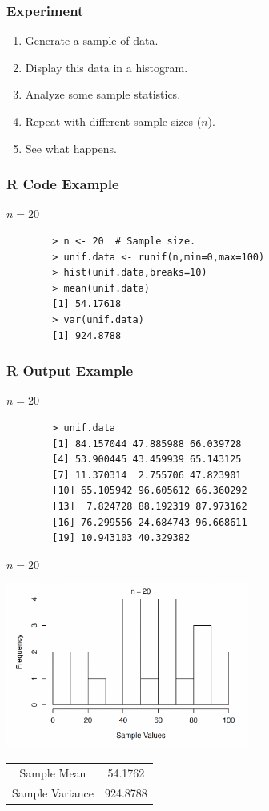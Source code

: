\documentclass[12pt]{beamer}
\begin{document}
\begin{frame}
	\frametitle{Experiment}
	
	\begin{enumerate}[label=\textcolor{blue}{\arabic*.}]
		\item Generate a sample of data.
		\item Display this data in a histogram.
		\item Analyze some sample statistics.
		\item Repeat with different sample sizes ($n$).
		\item See what happens.
	\end{enumerate}
	
\end{frame}
\begin{frame}[fragile]
	\frametitle{R Code Example}
	
	\begin{center}
		\Large $n = 20$
	\end{center}

	\begin{verbatim}
		> n <- 20  # Sample size.
		> unif.data <- runif(n,min=0,max=100)
		> hist(unif.data,breaks=10)
		> mean(unif.data)
		[1] 54.17618
		> var(unif.data)
		[1] 924.8788
	\end{verbatim}
	
\end{frame}
\begin{frame}[fragile]
	\frametitle{R Output Example}
	
	\begin{center}
		\Large $n = 20$
	\end{center}
	
	\begin{verbatim}
		> unif.data
		[1] 84.157044 47.885988 66.039728
		[4] 53.900445 43.459939 65.143125
		[7] 11.370314  2.755706 47.823901
		[10] 65.105942 96.605612 66.360292
		[13]  7.824728 88.192319 87.973162
		[16] 76.299556 24.684743 96.668611
		[19] 10.943103 40.329382
	\end{verbatim}
	
\end{frame}
\begin{frame}{$n=20$}
	
	\centering
	\includegraphics[width=8cm]{histo.png}
		\begin{tabular}{cc}
		\toprule
		Sample Mean& 54.1762\\
		Sample Variance&924.8788 \\
		\bottomrule
	\end{tabular}
\end{frame}
\end{document}

